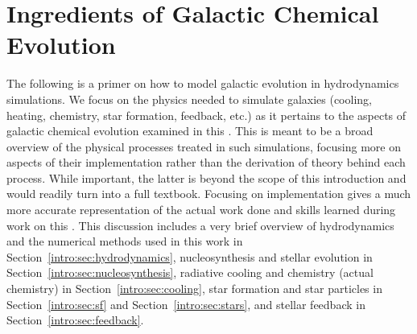 \section{Ingredients of Galactic Chemical Evolution}
\label{intro:sec:ingredients}

The following is a primer on how to model galactic evolution in hydrodynamics simulations. We focus on the physics needed to simulate galaxies (cooling, heating, chemistry, star formation, feedback, etc.) as it pertains to the aspects of galactic chemical evolution examined in this \dissertation. This is meant to be a broad overview of the physical processes treated in such simulations, focusing more on aspects of their implementation rather than the derivation of theory behind each process. While important, the latter is beyond the scope of this introduction and would readily turn into a full textbook. Focusing on implementation gives a much more accurate representation of the actual work done and skills learned during work on this \dissertation. This discussion includes a very brief overview of hydrodynamics and the numerical methods used in this work in Section~\ref{intro:sec:hydrodynamics}, nucleosynthesis and stellar evolution in Section~\ref{intro:sec:nucleosynthesis}, radiative cooling and chemistry (actual chemistry) in Section~\ref{intro:sec:cooling}, star formation and star particles in Section~\ref{intro:sec:sf} and Section~\ref{intro:sec:stars}, and stellar feedback in Section~\ref{intro:sec:feedback}.

